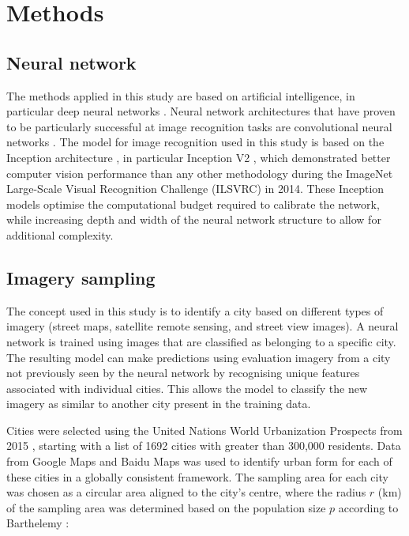 \documentclass[10pt,letterpaper,hidelinks]{article}
\begin{document}
\section*{Methods}\label{sec:methods}
\subsection*{Neural network}\label{sec:methods1}

The methods applied in this study are based on artificial intelligence, in particular deep neural networks \cite{Bishop1995,Samarasinghe2016,Graupe2013}. Neural network architectures that have proven to be particularly successful at image recognition tasks are convolutional neural networks \cite{Schmidhuber2015}. The model for image recognition used in this study is based on the Inception architecture \cite{Szegedy2015}, in particular Inception V2 \cite{Ioffe2015}, which demonstrated better computer vision performance than any other methodology during the ImageNet Large-Scale Visual Recognition Challenge (ILSVRC) \cite{Russakovsky2015} in 2014. These Inception models optimise the computational budget required to calibrate the network, while increasing depth and width of the neural network structure to allow for additional complexity.



\subsection*{Imagery sampling}\label{sec:methods2}

The concept used in this study is to identify a city based on different types of imagery (street maps, satellite remote sensing, and street view images). A neural network is trained using images that are classified as belonging to a specific city. The resulting model can make predictions using evaluation imagery from a city not previously seen by the neural network by recognising unique features associated with individual cities. This allows the model to classify the new imagery as similar to another city present in the training data. 

Cities were selected using the United Nations World Urbanization Prospects from 2015 \cite{UN2014}, starting with a list of 1692 cities with greater than 300,000 residents. Data from Google Maps and Baidu Maps was used to identify urban form for each of these cities in a globally consistent framework. The sampling area for each city was chosen as a circular area aligned to the city's centre, where the radius $r$ (km) of the sampling area was determined based on the population size $p$ according to Barthelemy \cite{Barthelemy2016}: 
\end{document}
